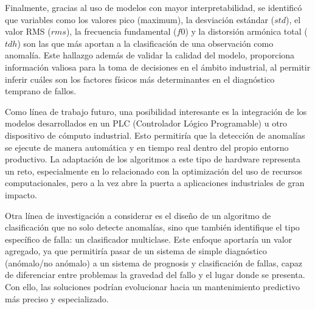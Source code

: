 \documentclass[11pt,a4paper,spanish]{book}
\numberwithin{equation}{chapter}
\numberwithin{figure}{chapter}
\begin{document}
Finalmente, gracias al uso de modelos con mayor interpretabilidad, se identificó que 
variables como los valores pico (maximum), la desviación estándar ($std$), el valor RMS 
($rms$),
la frecuencia fundamental ($f0$) y la distorsión armónica total ($tdh$) son las que más 
aportan a la clasificación de una observación como anomalía. Este hallazgo  además de 
validar la calidad del modelo, proporciona información valiosa para la toma de 
decisiones en el ámbito industrial, al permitir inferir cuáles son los factores físicos
más determinantes en el diagnóstico temprano de fallos.


Como línea de trabajo futuro, una posibilidad interesante es la integración de los 
modelos desarrollados en un PLC (Controlador Lógico Programable) u otro dispositivo
de cómputo industrial. Esto permitiría que la detección de anomalías se ejecute de 
manera automática y en tiempo real dentro del propio entorno productivo. La adaptación
de los algoritmos a este tipo de hardware representa un reto, especialmente en lo 
relacionado con la optimización del uso de recursos computacionales, pero a la vez abre
la puerta a aplicaciones industriales de gran impacto.


Otra línea de investigación a considerar es el diseño de un algoritmo de clasificación
que no solo detecte anomalías, sino que también identifique el tipo específico de falla:
un clasificador multiclase.  Este enfoque aportaría un valor agregado, ya que permitiría
pasar de un sistema de simple diagnóstico (anómalo/no anómalo) a un sistema de prognosis
y clasificación de fallas, capaz de diferenciar entre problemas la gravedad del fallo y 
el lugar donde se presenta. Con ello, las soluciones podrían evolucionar hacia un 
mantenimiento predictivo más preciso y especializado.






\end{document}
